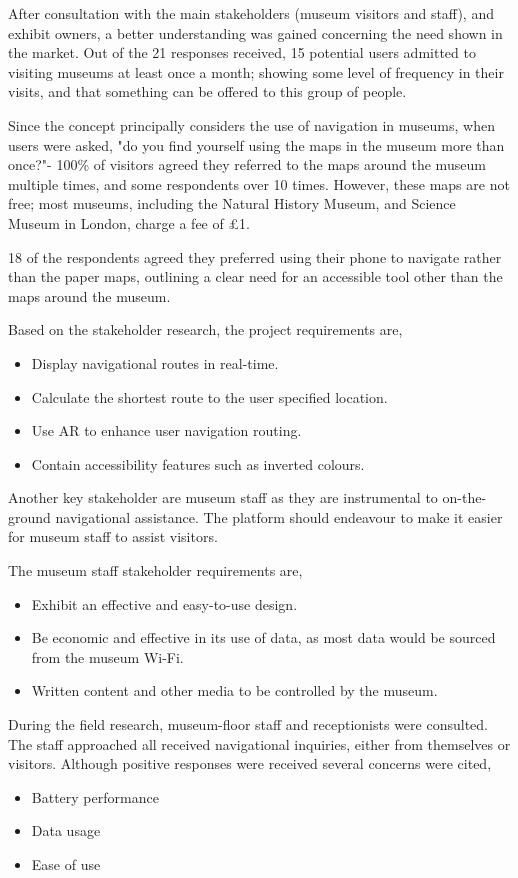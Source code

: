 
After consultation with the main stakeholders (museum visitors and staff), and exhibit owners, a better understanding was gained concerning the need shown in the market. Out of the 21 responses received, 15 potential users admitted to visiting museums at least once a month; showing some level of frequency in their visits, and that something can be offered to this group of people.

Since the concept principally considers the use of navigation in museums, when users were asked, "do you find yourself using the maps in the museum more than once?"- 100\% of visitors agreed they referred to the maps around the museum multiple times, and some respondents over 10 times. However, these maps are not free; most museums, including the Natural History Museum, and Science Museum in London, charge a fee of £1.

18 of the respondents agreed they preferred using their phone to navigate rather than the paper maps, outlining a clear need for an accessible tool other than the maps around the museum.

Based on the stakeholder research, the project requirements are, 
\begin{itemize}
    \item Display navigational routes in real-time.
    \item Calculate the shortest route to the user specified location.
    \item Use AR to enhance user navigation routing.
    \item Contain accessibility features such as inverted colours.
\end{itemize}

Another key stakeholder are museum staff as they are instrumental to on-the-ground navigational assistance. The platform should endeavour to make it easier for museum staff to assist visitors.

The museum staff stakeholder requirements are,
\begin{itemize}
    \item Exhibit an effective and easy-to-use design. 
    \item Be economic and effective in its use of data, as most data would be sourced from the museum Wi-Fi. 
    \item Written content and other media to be controlled by the museum.
\end{itemize}

During the field research, museum-floor staff and receptionists were consulted. The staff approached all received navigational inquiries, either from themselves or visitors. Although positive responses were received several concerns were cited,
\begin{itemize}
    \item Battery performance
    \item Data usage
    \item Ease of use
\end{itemize}